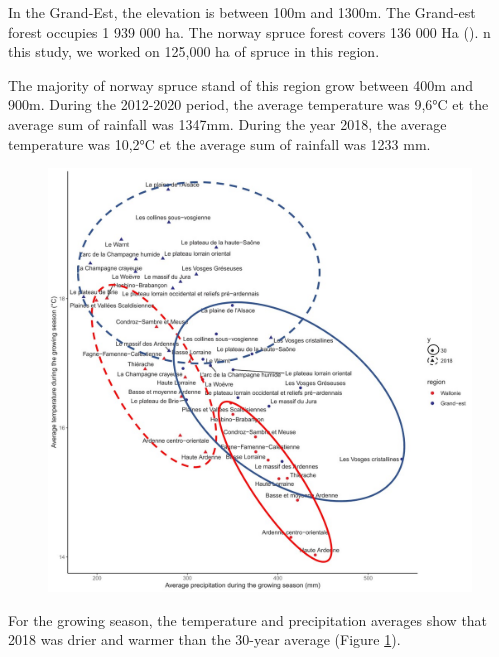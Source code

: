 \documentclass[3p,times]{elsarticle}
\begin{document}
In the Grand-Est, the elevation is between 100m and 1300m. The Grand-est forest occupies 1 939 000 ha. The norway spruce forest covers 136 000 Ha (\citep{francais_donnees_2022}).
n this study, we worked on 125,000 ha of spruce in this region.

The majority of norway spruce stand of this region grow between 400m and 900m.
During the 2012-2020 period, the average temperature was 9,6°C et the average sum of rainfall was 1347mm. During the year 2018, the average temperature was 10,2°C et the average sum of rainfall was 1233 mm.


\begin{figure}
	\centering
	\includegraphics[width=\textwidth]{clim_region_nat_GE_Wal_en.jpg}
	\caption{	}
	
	\label{fig:clim}
\end{figure}

For the growing season, the temperature and precipitation averages show that 2018 was drier and warmer than the 30-year average (Figure \ref{fig:clim}). 



\end{document}

